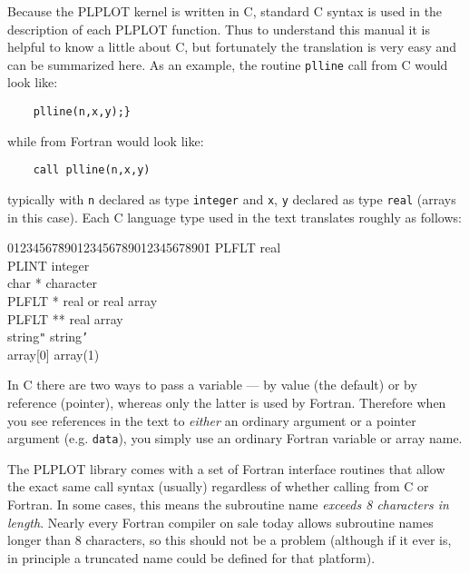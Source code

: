 Because the PLPLOT kernel is written in C, standard C syntax is used in the
description of each PLPLOT function.  Thus to understand this manual it is
helpful to know a little about C, but fortunately the translation is very
easy and can be summarized here.  As an example, the routine {\tt plline}
call from C would look like:
%
\begin{verbatim}
    plline(n,x,y);}
\end{verbatim}
%
while from Fortran would look like:
%
\begin{verbatim}
	call plline(n,x,y)
\end{verbatim}
%
typically with {\tt n} declared as type {\tt integer} and {\tt x}, {\tt y}
declared as type {\tt real} (arrays in this case).  Each C language type
used in the text translates roughly as follows:
\begin{tabbing}
01234567\=
	890123456789012345678901\=\kill
%
	\>PLFLT			\>real\\
	\>PLINT			\>integer\\
	\>char *		\>character\\
	\>PLFLT *		\>real or real array\\
	\>PLFLT **		\>real array\\
	string{\tt"}	string{\tt'}\\
	\>array[0]		\>array(1)\\
\end{tabbing}
In C there are two ways to pass a variable --- by value (the default) or by
reference (pointer), whereas only the latter is used by Fortran.
Therefore when you see references in the text to {\em either} an ordinary
argument or a pointer argument (e.g.  {\tt *data}), you simply use an
ordinary Fortran variable or array name.

The PLPLOT library comes with a set of Fortran interface routines that
allow the exact same call syntax (usually) regardless of whether calling
from C or Fortran.  In some cases, this means the subroutine name {\em
exceeds 8 characters in length}.  Nearly every Fortran compiler on sale
today allows subroutine names longer than 8 characters, so this should not
be a problem (although if it ever is, in principle a truncated name could
be defined for that platform).


